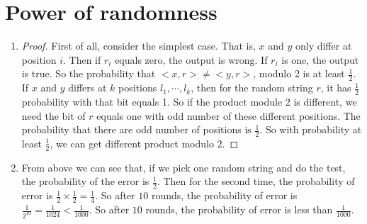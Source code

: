 \documentclass{article}
\begin{document}
	\section{Power of randomness}
		\begin{enumerate}	
			\item \begin{proof}
				First of all, consider the simplest case. That is, $x$ and $y$ only differ at position $i$. Then if $r_i$ equals zero, the output is wrong. If $r_i$ is one, the output is true. So the probability that $<x,r>\neq<y,r>$, modulo 2 is at least $\frac{1}{2}$. \newline
				If $x$ and $y$ differs at $k$ positions $l_1, \cdots, l_k$, then for the random string $r$, it has $\frac{1}{2}$ probability with that bit equals 1. So if the product module 2 is different, we need the bit of $r$ equals one with odd number of these different positions. The probability that there are odd number of positions is $\frac{1}{2}$. So with probability at least $\frac{1}{2}$, we can get different product modulo 2. \end{proof}
			\item From above we can see that, if we pick one random string and do the test, the probability of the error is $\frac{1}{2}$. Then for the second time, the probability of error is $\frac{1}{2} \times \frac{1}{2} = \frac{1}{4}$. So after $10$ rounds, the probability of error is $\frac{1}{2^{10}} = \frac{1}{1024} < \frac{1}{1000}$. So after $10$ rounds, the probability of error is less than $\frac{1}{1000}$.
		\end{enumerate}
\end{document}
